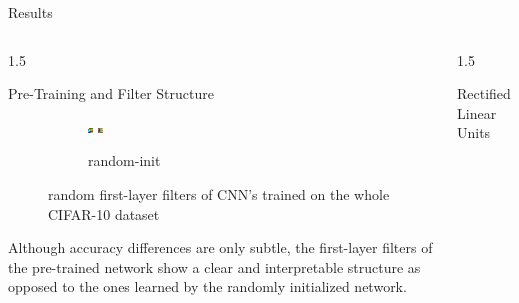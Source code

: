 \documentclass[final]{beamer}
\newlength{\onecolwid}
\newlength{\threecolwid}
\begin{document}
\begin{frame}[t]
\begin{columns}[t]
\begin{column}{\threecolwid}
\begin{alertblock}{Results}
\begin{columns}[t]
\begin{column}{1.5\onecolwid}
\begin{block}{Pre-Training and Filter Structure}
\begin{figure}
\begin{subfigure}{.4\linewidth}
					\includegraphics[width=0.1\linewidth]{graphics/cifar_filters/random_17.png} %
					\includegraphics[width=0.1\linewidth]{graphics/cifar_filters/random_18.png}
					\caption{random-init}
				\end{subfigure}

				\caption{random first-layer filters of CNN's trained on the whole CIFAR-10 dataset}

			\end{figure}

			Although accuracy differences are only subtle, the first-layer filters of the pre-trained network show a clear and interpretable structure as opposed to the ones learned by the randomly initialized network.

		\end{block}

	\end{column}

	\begin{column}{1.5\onecolwid}

		\begin{block}{Rectified Linear Units}

			\begin{figure}
				\centering

				\begin{subfigure}{0.4\linewidth}


\end{subfigure}
\end{figure}
\end{block}
\end{column}
\end{columns}
\end{alertblock}
\end{column}
\end{columns}
\end{frame}
\end{document}
